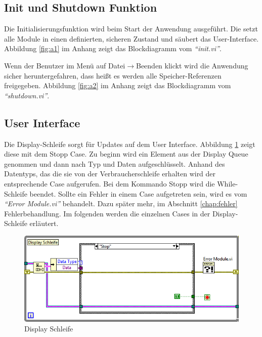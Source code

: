 		
		

\subsection{Init und Shutdown Funktion}	%
Die Initialisierungsfunktion wird beim Start der Anwendung ausgeführt. Die setzt alle Module in einen definierten, sicheren Zustand und säubert das User-Interface. Abbildung \ref{fig:a1} im Anhang zeigt das Blockdiagramm vom \textit{"`init.vi"'}.

Wenn der Benutzer im Menü auf Datei$\rightarrow$Beenden klickt wird die Anwendung sicher heruntergefahren, dass heißt es werden alle Speicher-Referenzen freigegeben. Abbildung \ref{fig:a2} im Anhang zeigt das Blockdiagramm vom \textit{"`shutdown.vi"'}.

\subsection{User Interface}
Die Display-Schleife sorgt für Updates auf dem User Interface.  Abbildung \ref{fig:disp} zeigt diese mit dem Stopp Case. Zu beginn wird ein Element aus der Display Queue genommen und dann nach Typ und Daten aufgeschlüsselt. Anhand des Datentyps, das die sie von der Verbraucherschleife erhalten wird der entsprechende Case aufgerufen. Bei dem Kommando Stopp wird die While-Schleife beendet. Sollte ein Fehler in einem Case aufgetreten sein, wird es vom \textit{"`Error Module.vi"'} behandelt. Dazu später mehr, im Abschnitt \ref{chap:fehler} Fehlerbehandlung. Im folgenden werden die einzelnen Cases in der Display-Schleife erläutert.

	\begin{figure}[h!]
	\centering
		\includegraphics[width=\textwidth]{Pics/front-stop.png}
	\caption{Display Schleife}
	\label{fig:disp}
	\end{figure}


